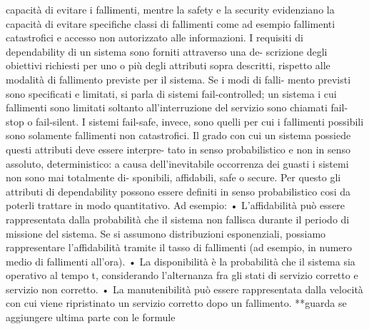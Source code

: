 \documentclass[14pt]{extarticle}
\begin{document}
capacità di evitare i fallimenti, mentre la safety e la security evidenziano la
capacità di evitare specifiche classi di fallimenti come ad esempio fallimenti
catastrofici e accesso non autorizzato alle informazioni.
I requisiti di dependability di un sistema sono forniti attraverso una de-
scrizione degli obiettivi richiesti per uno o più degli attributi sopra descritti,
rispetto alle modalità di fallimento previste per il sistema. Se i modi di falli-
mento previsti sono specificati e limitati, si parla di sistemi fail-controlled; un
sistema i cui fallimenti sono limitati soltanto all’interruzione del servizio sono
chiamati fail-stop o fail-silent. I sistemi fail-safe, invece, sono quelli per cui i
fallimenti possibili sono solamente fallimenti non catastrofici.
Il grado con cui un sistema possiede questi attributi deve essere interpre-
tato in senso probabilistico e non in senso assoluto, deterministico: a causa
dell’inevitabile occorrenza dei guasti i sistemi non sono mai totalmente di-
sponibili, affidabili, safe o secure. Per questo gli attributi di dependability
possono essere definiti in senso probabilistico cosi da poterli trattare in modo
quantitativo.
Ad esempio:
• L’affidabilità può essere rappresentata dalla probabilità che il sistema
non fallisca durante il periodo di missione del sistema. Se si assumono
distribuzioni esponenziali, possiamo rappresentare l’affidabilità tramite
il tasso di fallimenti (ad esempio, in numero medio di fallimenti all’ora).
• La disponibilità è la probabilità che il sistema sia operativo al tempo t,
considerando l’alternanza fra gli stati di servizio corretto e servizio non
corretto.
• La manutenibilità può essere rappresentata dalla velocità con cui viene
ripristinato un servizio corretto dopo un fallimento.
**guarda se aggiungere ultima parte con le formule
\end{document}
